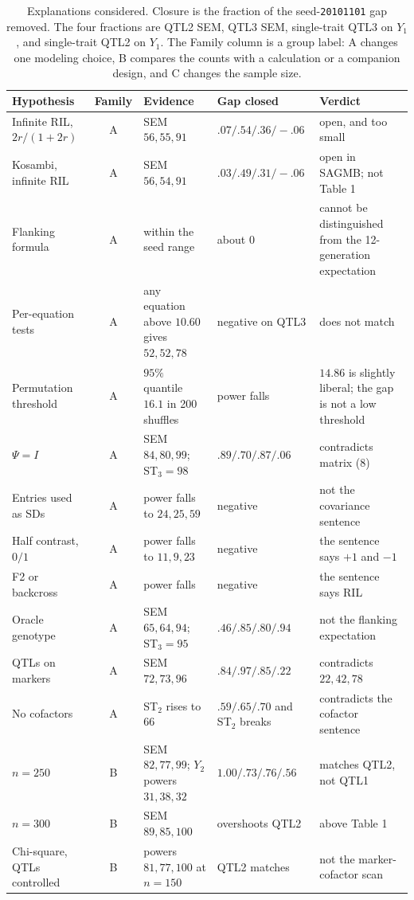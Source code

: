 \documentclass[11pt]{article}
\begin{document}
\begin{table}[ht]
\centering
\scriptsize
\caption{Explanations considered. Closure is the fraction of the
seed-\texttt{20101101} gap removed. The four fractions are QTL2 SEM,
QTL3 SEM, single-trait QTL3 on $Y_1$, and single-trait QTL2 on $Y_1$.
The Family column is a group label: A changes one modeling choice, B
compares the counts with a calculation or a companion design, and C changes
the sample size.}
\label{tab:explanations}
\begin{tabular}{p{3.3cm}cp{3.6cm}p{2.4cm}p{2.6cm}}
\hline
Hypothesis & Family & Evidence & Gap closed & Verdict \\
\hline
Infinite RIL, $2r/(1+2r)$ & A & SEM $56,55,91$ & $.07/.54/.36/-.06$ & open, and too small \\
Kosambi, infinite RIL & A & SEM $56,54,91$ & $.03/.49/.31/-.06$ & open in SAGMB; not Table 1 \\
Flanking formula & A & within the seed range & about $0$ & cannot be distinguished from the 12-generation expectation \\
Per-equation tests & A & any equation above $10.60$ gives $52,52,78$ & negative on QTL3 & does not match \\
Permutation threshold & A & $95\%$ quantile $16.1$ in 200 shuffles & power falls & $14.86$ is slightly liberal; the gap is not a low threshold \\
$\Psi=I$ & A & SEM $84,80,99$; ST$_3=98$ & $.89/.70/.87/.06$ & contradicts matrix (8) \\
Entries used as SDs & A & power falls to $24,25,59$ & negative & not the covariance sentence \\
Half contrast, $0/1$ & A & power falls to $11,9,23$ & negative & the sentence says $+1$ and $-1$ \\
F2 or backcross & A & power falls & negative & the sentence says RIL \\
Oracle genotype & A & SEM $65,64,94$; ST$_3=95$ & $.46/.85/.80/.94$ & not the flanking expectation \\
QTLs on markers & A & SEM $72,73,96$ & $.84/.97/.85/.22$ & contradicts $22,42,78$ \\
No cofactors & A & ST$_2$ rises to $66$ & $.59/.65/.70$ and ST$_2$ breaks & contradicts the cofactor sentence \\
$n=250$ & B & SEM $82,77,99$; $Y_2$ powers $31,38,32$ & $1.00/.73/.76/.56$ & matches QTL2, not QTL1 \\
$n=300$ & B & SEM $89,85,100$ & overshoots QTL2 & above Table 1 \\
Chi-square, QTLs controlled & B & powers $81,77,100$ at $n=150$ & QTL2 matches & not the marker-cofactor scan \\
\hline
\end{tabular}
\end{table}
\end{document}
